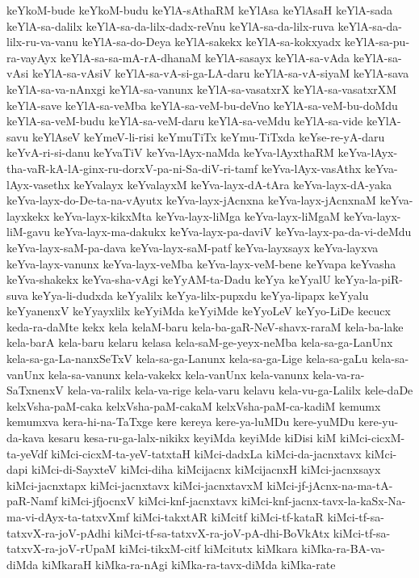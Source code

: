 {keYkoM-bude
keYkoM-budu
keYlA-sAthaRM
keYlAsa
keYlAsaH
keYlA-sada
keYlA-sa-dalilx
keYlA-sa-da-lilx-dadx-reVnu
keYlA-sa-da-lilx-ruva
keYlA-sa-da-lilx-ru-va-vanu
keYlA-sa-do-Deya
keYlA-sakekx
keYlA-sa-kokxyadx
keYlA-sa-pu-ra-vayAyx
keYlA-sa-sa-mA-rA-dhanaM
keYlA-sasayx
keYlA-sa-vAda
keYlA-sa-vAsi
keYlA-sa-vAsiV
keYlA-sa-vA-si-ga-LA-daru
keYlA-sa-vA-siyaM
keYlA-sava
keYlA-sa-va-nAnxgi
keYlA-sa-vanunx
keYlA-sa-vasatxrX
keYlA-sa-vasatxrXM
keYlA-save
keYlA-sa-veMba
keYlA-sa-veM-bu-deVno
keYlA-sa-veM-bu-doMdu
keYlA-sa-veM-budu
keYlA-sa-veM-daru
keYlA-sa-veMdu
keYlA-sa-vide
keYlA-savu
keYlAseV
keYmeV-li-risi
keYmuTiTx
keYmu-TiTxda
keYse-re-yA-daru
keYvA-ri-si-danu
keYvaTiV
keYva-lAyx-naMda
keYva-lAyxthaRM
keYva-lAyx-tha-vaR-kA-lA-ginx-ru-dorxV-pa-ni-Sa-diV-ri-tamf
keYva-lAyx-vasAthx
keYva-lAyx-vasethx
keYvalayx
keYvalayxM
keYva-layx-dA-tAra
keYva-layx-dA-yaka
keYva-layx-do-De-ta-na-vAyutx
keYva-layx-jAcnxna
keYva-layx-jAcnxnaM
keYva-layxkekx
keYva-layx-kikxMta
keYva-layx-liMga
keYva-layx-liMgaM
keYva-layx-liM-gavu
keYva-layx-ma-dakukx
keYva-layx-pa-daviV
keYva-layx-pa-da-vi-deMdu
keYva-layx-saM-pa-dava
keYva-layx-saM-patf
keYva-layxsayx
keYva-layxva
keYva-layx-vanunx
keYva-layx-veMba
keYva-layx-veM-bene
keYvapa
keYvasha
keYva-shakekx
keYva-sha-vAgi
keYyAM-ta-Dadu
keYya
keYyalU
keYya-la-piR-suva
keYya-li-dudxda
keYyalilx
keYya-lilx-pupxdu
keYya-lipapx
keYyalu
keYyanenxV
keYyayxlilx
keYyiMda
keYyiMde
keYyoLeV
keYyo-LiDe
kecucx
keda-ra-daMte
kekx
kela
kelaM-baru
kela-ba-gaR-NeV-shavx-raraM
kela-ba-lake
kela-barA
kela-baru
kelaru
kelasa
kela-saM-ge-yeyx-neMba
kela-sa-ga-LanUnx
kela-sa-ga-La-nanxSeTxV
kela-sa-ga-Lanunx
kela-sa-ga-Lige
kela-sa-gaLu
kela-sa-vanUnx
kela-sa-vanunx
kela-vakekx
kela-vanUnx
kela-vanunx
kela-va-ra-SaTxnenxV
kela-va-ralilx
kela-va-rige
kela-varu
kelavu
kela-vu-ga-Lalilx
kele-daDe
kelxVsha-paM-caka
kelxVsha-paM-cakaM
kelxVsha-paM-ca-kadiM
kemumx
kemumxva
kera-hi-na-TaTxge
kere
kereya
kere-ya-luMDu
kere-yuMDu
kere-yu-da-kava
kesaru
kesa-ru-ga-lalx-nikikx
keyiMda
keyiMde
kiDisi
kiM
kiMci-cicxM-ta-yeVdf
kiMci-cicxM-ta-yeV-tatxtaH
kiMci-dadxLa
kiMci-da-jacnxtavx
kiMci-dapi
kiMci-di-SayxteV
kiMci-diha
kiMcijacnx
kiMcijacnxH
kiMci-jacnxsayx
kiMci-jacnxtapx
kiMci-jacnxtavx
kiMci-jacnxtavxM
kiMci-jf-jAcnx-na-ma-tA-paR-Namf
kiMci-jfjocnxV
kiMci-knf-jacnxtavx
kiMci-knf-jacnx-tavx-la-kaSx-Na-ma-vi-dAyx-ta-tatxvXmf
kiMci-takxtAR
kiMcitf
kiMci-tf-kataR
kiMci-tf-sa-tatxvX-ra-joV-pAdhi
kiMci-tf-sa-tatxvX-ra-joV-pA-dhi-BoVkAtx
kiMci-tf-sa-tatxvX-ra-joV-rUpaM
kiMci-tikxM-citf
kiMcitutx
kiMkara
kiMka-ra-BA-va-diMda
kiMkaraH
kiMka-ra-nAgi
kiMka-ra-tavx-diMda
kiMka-rate
}
